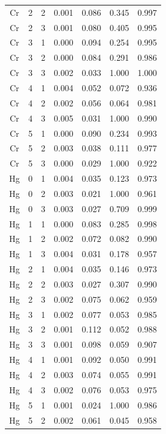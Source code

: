 \documentclass[ms, hidelinks]{uncgdissertationexp}
\theoremstyle{plain}
\theoremstyle{definition}
\theoremstyle{remark}
\begin{document}
\begin{longtable}{ccccccc}
Cr & 2 & 2 & 0.001 & 0.086 & 0.345 & 0.997\\
\rowcolor{gray!6}  Cr & 2 & 3 & 0.001 & 0.080 & 0.405 & 0.995\\
Cr & 3 & 1 & 0.000 & 0.094 & 0.254 & 0.995\\
\rowcolor{gray!6}  Cr & 3 & 2 & 0.000 & 0.084 & 0.291 & 0.986\\
Cr & 3 & 3 & 0.002 & 0.033 & 1.000 & 1.000\\
\rowcolor{gray!6}  Cr & 4 & 1 & 0.004 & 0.052 & 0.072 & 0.936\\
Cr & 4 & 2 & 0.002 & 0.056 & 0.064 & 0.981\\
\rowcolor{gray!6}  Cr & 4 & 3 & 0.005 & 0.031 & 1.000 & 0.990\\
Cr & 5 & 1 & 0.000 & 0.090 & 0.234 & 0.993\\
\rowcolor{gray!6}  Cr & 5 & 2 & 0.003 & 0.038 & 0.111 & 0.977\\
Cr & 5 & 3 & 0.000 & 0.029 & 1.000 & 0.922\\
\rowcolor{gray!6}  Hg & 0 & 1 & 0.004 & 0.035 & 0.123 & 0.973\\
Hg & 0 & 2 & 0.003 & 0.021 & 1.000 & 0.961\\
\rowcolor{gray!6}  Hg & 0 & 3 & 0.003 & 0.027 & 0.709 & 0.999\\
Hg & 1 & 1 & 0.000 & 0.083 & 0.285 & 0.998\\
\rowcolor{gray!6}  Hg & 1 & 2 & 0.002 & 0.072 & 0.082 & 0.990\\
Hg & 1 & 3 & 0.004 & 0.031 & 0.178 & 0.957\\
\rowcolor{gray!6}  Hg & 2 & 1 & 0.004 & 0.035 & 0.146 & 0.973\\
Hg & 2 & 2 & 0.003 & 0.027 & 0.307 & 0.990\\
\rowcolor{gray!6}  Hg & 2 & 3 & 0.002 & 0.075 & 0.062 & 0.959\\
Hg & 3 & 1 & 0.002 & 0.077 & 0.053 & 0.985\\
\rowcolor{gray!6}  Hg & 3 & 2 & 0.001 & 0.112 & 0.052 & 0.988\\
Hg & 3 & 3 & 0.001 & 0.098 & 0.059 & 0.907\\
\rowcolor{gray!6}  Hg & 4 & 1 & 0.001 & 0.092 & 0.050 & 0.991\\
Hg & 4 & 2 & 0.003 & 0.074 & 0.055 & 0.991\\
\rowcolor{gray!6}  Hg & 4 & 3 & 0.002 & 0.076 & 0.053 & 0.975\\
Hg & 5 & 1 & 0.001 & 0.024 & 1.000 & 0.986\\
\rowcolor{gray!6}  Hg & 5 & 2 & 0.002 & 0.061 & 0.045 & 0.958\\

\end{longtable}
\end{document}
